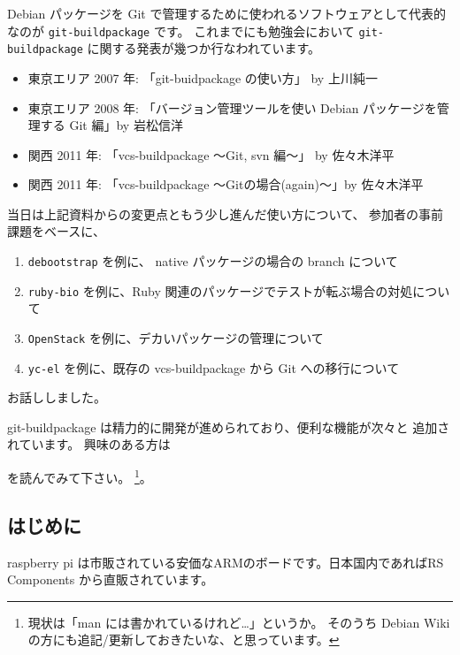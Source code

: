 \documentclass[mingoth,a4paper]{jsarticle}
\begin{document}
Debian パッケージを Git で管理するために使われるソフトウェアとして代表的なのが
\texttt{git-buildpackage} です。
これまでにも勉強会において
\texttt{git-buildpackage} に関する発表が幾つか行なわれています。
\begin{itemize}
\item 東京エリア 2007 年: 「git-buidpackage の使い方」 by 上川純一
\item 東京エリア 2008 年: 「バージョン管理ツールを使い Debian パッケージを管理する Git 編」by 岩松信洋
\item 関西 2011 年: 「vcs-buildpackage 〜Git, svn 編〜」 by 佐々木洋平
\item 関西 2011 年: 「vcs-buildpackage 〜Gitの場合(again)〜」by 佐々木洋平
\end{itemize}

当日は上記資料からの変更点ともう少し進んだ使い方について、
参加者の事前課題をベースに、
\begin{enumerate}
\item \texttt{debootstrap} を例に、 native パッケージの場合の branch について
\item \texttt{ruby-bio} を例に、Ruby 関連のパッケージでテストが転ぶ場合の対処について
\item \texttt{OpenStack} を例に、デカいパッケージの管理について
\item \texttt{yc-el} を例に、既存の vcs-buildpackage から Git への移行について
\end{enumerate}
お話ししました。

git-buildpackage は精力的に開発が進められており、便利な機能が次々と
追加されています。
興味のある方は
を読んでみて下さい。
\footnote{%
  現状は「man には書かれているけれど…」というか。
  そのうち Debian Wiki の方にも追記/更新しておきたいな、と思っています。%
}。


\subsection{はじめに}

raspberry pi は市販されている安価なARMのボードです。日本国内であればRS
Components から直販されています。
\end{document}
